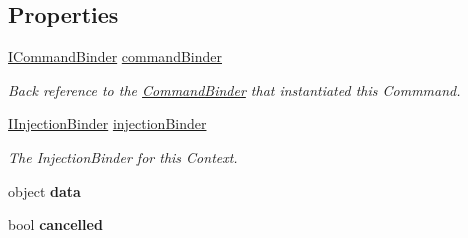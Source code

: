 \subsection*{Properties}
\begin{DoxyCompactItemize}
\item 
\hypertarget{classstrange_1_1extensions_1_1command_1_1impl_1_1_command_a97536a752bfdb962d4b6a9fe31888472}{\hyperlink{interfacestrange_1_1extensions_1_1command_1_1api_1_1_i_command_binder}{I\-Command\-Binder} \hyperlink{classstrange_1_1extensions_1_1command_1_1impl_1_1_command_a97536a752bfdb962d4b6a9fe31888472}{command\-Binder}}\label{classstrange_1_1extensions_1_1command_1_1impl_1_1_command_a97536a752bfdb962d4b6a9fe31888472}

\begin{DoxyCompactList}\small\item\em Back reference to the \hyperlink{classstrange_1_1extensions_1_1command_1_1impl_1_1_command_binder}{Command\-Binder} that instantiated this Commmand. \end{DoxyCompactList}\item 
\hypertarget{classstrange_1_1extensions_1_1command_1_1impl_1_1_command_a6cddeeed15d2f3bb2b434ae7f8450fd4}{\hyperlink{interfacestrange_1_1extensions_1_1injector_1_1api_1_1_i_injection_binder}{I\-Injection\-Binder} \hyperlink{classstrange_1_1extensions_1_1command_1_1impl_1_1_command_a6cddeeed15d2f3bb2b434ae7f8450fd4}{injection\-Binder}}\label{classstrange_1_1extensions_1_1command_1_1impl_1_1_command_a6cddeeed15d2f3bb2b434ae7f8450fd4}

\begin{DoxyCompactList}\small\item\em The Injection\-Binder for this Context. \end{DoxyCompactList}\item 
\hypertarget{classstrange_1_1extensions_1_1command_1_1impl_1_1_command_af313eea4d80d65db2a526d5ce28712e8}{object {\bfseries data}}\label{classstrange_1_1extensions_1_1command_1_1impl_1_1_command_af313eea4d80d65db2a526d5ce28712e8}

\item 
\hypertarget{classstrange_1_1extensions_1_1command_1_1impl_1_1_command_a6cf80e414ea49add9026d441466c119a}{bool {\bfseries cancelled}}\label{classstrange_1_1extensions_1_1command_1_1impl_1_1_command_a6cf80e414ea49add9026d441466c119a}


\end{DoxyCompactItemize}
